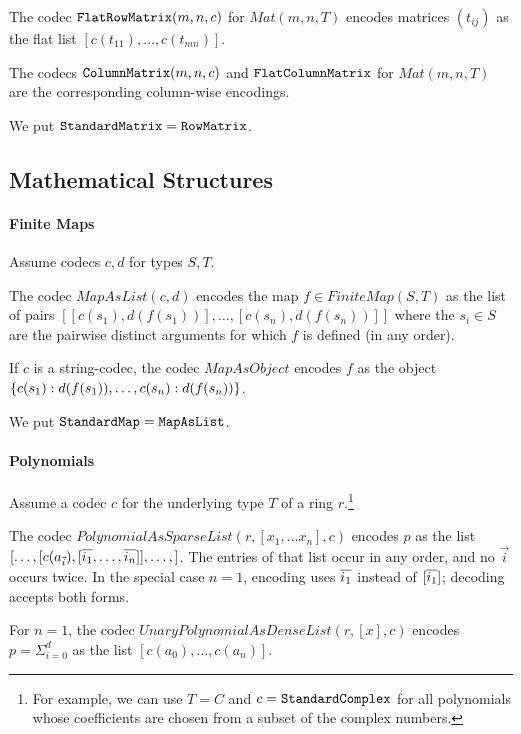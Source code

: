 The codec $\cn{FlatRowMatrix}(m,n,c)$ for $Mat(m,n,T)$ encodes matrices $(t_{ij})$ as the flat list $[c(t_{11}),\ldots,c(t_{mn})]$.

The codecs $\cn{ColumnMatrix}(m,n,c)$ and $\cn{FlatColumnMatrix}$ for $Mat(m,n,T)$ are the corresponding column-wise encodings.

We put $\cn{StandardMatrix}=\cn{RowMatrix}$.

\subsection{Mathematical Structures}

\paragraph{Finite Maps}
Assume codecs $c,d$ for types $S,T$.

The codec $MapAsList(c,d)$ encodes the map $f\in FiniteMap(S,T)$ as the list of pairs $[[c(s_1),d(f(s_1))],\ldots,[c(s_n),d(f(s_n))]]$ where the $s_i\in S$ are the pairwise distinct arguments for which $f$ is defined (in any order).

If $c$ is a string-codec, the codec $MapAsObject$ encodes $f$ as the object $\jobj{c(s_1):d(f(s_1)),\ldots,c(s_n):d(f(s_n))}$.

We put $\cn{StandardMap}=\cn{MapAsList}$.

\paragraph{Polynomials}
Assume a codec $c$ for the underlying type $T$ of a ring $r$.\footnote{For example, we can use $T=C$ and $c=\cn{StandardComplex}$ for all polynomials whose coefficients are chosen from a subset of the complex numbers.}

The codec $PolynomialAsSparseList(r,[x_1,\ldots x_n],c)$ encodes $p$ as the list $[\ldots,[c(a_{\vec{i}}),[\ov{i_1},\ldots,\ov{i_n}]],\ldots,]$.
The entries of that list occur in any order, and no $\vec{i}$ occurs twice.
In the special case $n=1$, encoding uses $\ov{i_1}$ instead of $[\ov{i_1}]$; decoding accepts both forms.

For $n=1$, the codec $UnaryPolynomialAsDenseList(r,[x],c)$ encodes $p=\Sigma_{i=0}^d$ as the list $[c(a_0),\ldots,c(a_n)]$.

